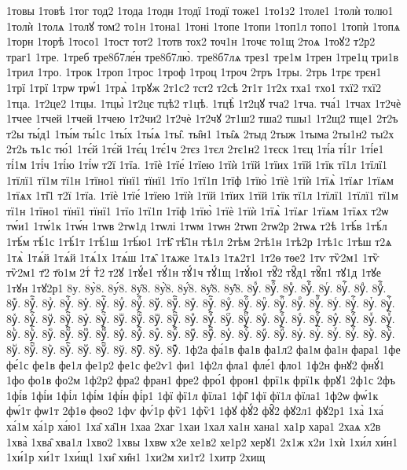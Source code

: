 {1товы
1товѣ
1тог
тод2
1тода
1тодн
1тодї
1тодї
тоже1
1то1з2
1толе1
1толѝ
толю1
1толѝ
1толѧ
1толꙋ
том2
то1н
1тона1
1тоні
1топе
1топи
1топ1л
топо1
1топѝ
1топѧ
1торн
1торѣ
1тосо1
1тост
тот2
1тотв
тох2
точ1н
1точє
то1щ
2тоѧ
1тоꙋ2
т2р2
траг1
1тре.
1треб
тре8б7ле́н
тре8б7лю̀.
тре8б7лѧ
трез1
тре1м
1трен
1тре1ц
три1в
1трил
1тро.
1трок
1троп
1трос
1троф
1троц
1троч
2тръ
1тры.
2трь
1трє
трєн1
1трї
1трї
1трѡ
трѡ́1
1трѧ̀
1трꙋж
2т1с2
тст2
т2сѣ
2т1т
1т2х
тха1
тхо1
тхї2
тхї2
1тца.
1т2це2
1тцы.
1тцы̀
1т2цє
тцѣ2
т1цѣ.
1тцѣ̀
1т2цꙋ
тча2
1тча.
тча́1
1тчах
1т2чѐ
1тчее
1тчей
1тчей
1тчею
1т2чи2
1т2чѐ
1т2чꙋ
2т1ш2
тша2
тшы1
1т2щ2
тще1
2т2ъ
т2ы
ты́д1
1ты́м
ты́1с
1ты́х
1ты́ѧ
1ты̑.
ты̑н1
1ты̑ѧ
2тыд
2тыж
1тыма
2ты1н2
ты2х
2т2ь
ть1с
тю́1
1тє́й
1тє́й
1тє́ц
1тє́1ч
2тєз
1тєл
2тє1н2
1тєск
1тєц
1ті́а
ті́1г
1ті́е1
ті́1м
1ті́ч
1ті́ю
1ті́ѡ
т2ї
1тїа.
1тїѐ
1тїе́
1тїею
1тїѝ
1тїй
1тїих
1тїй
1тїк
тї1л
1тїлї1
1тїлї1
тї1м
тї1н
1тїно1
тїнї1
тїнї1
1тїо
1тї1п
1тїф
1тїю̀
1тїѐ
1тїѝ
1тїѧ̀
1тїѧг
1тїѧм
1тїѧх
1ті̑1
т2ї
1тїа.
1тїѐ
1тїе́
1тїею
1тїѝ
1тїй
1тїих
1тїй
1тїк
тї1л
1тїлї1
1тїлї1
тї1м
тї1н
1тїно1
тїнї1
тїнї1
1тїо
1тї1п
1тїф
1тїю̀
1тїѐ
1тїѝ
1тїѧ̀
1тїѧг
1тїѧм
1тїѧх
т2ѡ
тѡ́и1
1тѡ́1к
1тѡ́н
1тѡв
2тѡ1д
1тѡлі
1тѡм
1тѡн
2тѡп
2тѡ2р
2тѡѧ
т2ѣ
1тѣ́в
1тѣ́л
1тѣ́м
тѣ́1с
1тѣ́1т
1тѣ́1ш
1тѣ́ю1
1тѣ̑
тѣ̑1н
тѣ1л
2тѣм
2тѣ1н
1тѣ2р
1тѣ1с
1тѣш
т2ѧ
1тѧ̀
1тѧ́й
1тѧ́й
1тѧ́1х
1тѧ́ш
1тѧ̑
1тѧже
1тѧ1з
1тѧ2т1
1т2ѳ
тѳе2
1тѵ
тѷ2м1
1тѷ
тѷ2м1
т҃2
т҃о1м
2тⷭ
тⷯ2
т2ꙋ
1тꙋ́е1
тꙋ́1н
тꙋ́1ч
тꙋ́1щ
1тꙋ́ю1
тꙋ̑2
тꙋ̑д1
тꙋ̑п1
тꙋ1д
1тꙋе
1тꙋн
1тꙋ2р1
8у.
8у̀8.
8у́8.
8у̑8.
8у҆̀8.
8у҆́8.
8у҆̈8.
8у҆̑8.
8уⷠ.
8уⷠ҇.
8уⷡ.
8уⷡ҇.
8уⷢ.
8уⷢ҇.
8уⷣ.
8уⷣ҇.
8уⷤ.
8уⷤ҇.
8уⷥ.
8уⷥ҇.
8уⷦ.
8уⷦ҇.
8уⷧ.
8уⷧ҇.
8уⷨ.
8уⷨ҇.
8уⷩ.
8уⷩ҇.
8уⷪ.
8уⷪ҇.
8уⷫ.
8уⷫ҇.
8уⷬ.
8уⷬ҇.
8уⷭ.
8уⷭ҇.
8уⷮ.
8уⷮ҇.
8уⷯ.
8уⷯ҇.
8уⷰ.
8уⷰ҇.
8уⷱ.
8уⷱ҇.
8уⷲ.
8уⷲ҇.
8уⷳ.
8уⷳ҇.
8уⷴ.
8уⷴ҇.
8уⷵ.
8уⷵ҇.
8уⷶ.
8уⷶ҇.
8уⷷ.
8уⷷ҇.
8уⷸ.
8уⷸ҇.
8уⷹ.
8уⷹ҇.
8уⷺ.
8уⷺ҇.
8уⷻ.
8уⷻ҇.
8уⷼ.
8уⷼ҇.
8уⷽ.
8уⷽ҇.
8уⷾ.
8уⷾ҇.
8уⷿ.
8уⷿ҇.
8уꙴ.
8уꙴ҇.
8уꙵ.
8уꙵ҇.
8уꙶ.
8уꙶ҇.
8уꙷ.
8уꙷ҇.
8уꙸ.
8уꙸ҇.
8уꙹ.
8уꙹ҇.
8уꙺ.
8уꙺ҇.
8уꙻ.
8уꙻ҇.
8у꙼.
8у꙼҇.
8у꙽.
8у꙽҇.
1ф2а
фа́1в
фа1в
фа1л2
фа1м
фа1н
фара1
1фе
фе́1с
фе1в
фе1л
фе1р2
фе1с
фе2ѵ1
фи1
1ф2л
фла1
фле́1
фло1
1ф2н
фнꙋ2
фнꙋ́1
1фо
фо1в
фо2м
1ф2р2
фра2
фран1
фре2
фро́1
фрон1
фрї1к
фрї1к
фрꙋ1
2ф1с
2фъ
1фі́в
1фі́и
1фі́л
1фі́м
1фі́н
фі́р1
1фї
фї1л
фїла1
1фі̑
1фї
фї1л
фїла1
1ф2ѡ
фѡ́1к
фѡ́1т
фѡ1т
2ф1ѳ
фѳо2
1фѵ
фѵ́1р
фѷ1
1фѷ1
1фꙋ
фꙋ́2
фꙋ̑2
фꙋ2л1
фꙋ2р1
1ха̀
1ха́
ха́1м
ха́1р
ха́ю1
1ха̑
ха̑1н
1хаа
2хаг
1хаи
1хал
ха1н
хана1
ха1р
хара1
2хаѧ
х2в
1хва̀
1хва̑
хва1л
1хво2
1хвы
1хвѡ
х2е
хе1в2
хе1р2
херꙋ1
2х1ж
х2и
1хѝ
1хи́л
хи́н1
1хи́1р
хи́1т
1хи́щ1
1хи̑
хи̑н1
1хи2м
хи1т2
1хитр
2хищ
}
